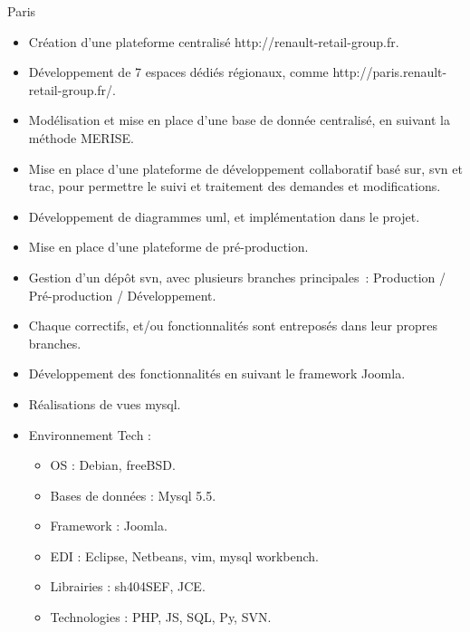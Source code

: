 \documentclass[10pt,a4paper,sans]{moderncv}
\begin{document}
{Paris}{
    \begin{itemize}%
        \item Création d'une plateforme centralisé http://renault-retail-group.fr.
        \item Développement de 7 espaces dédiés régionaux, comme http://paris.renault-retail-group.fr/.
        \item Modélisation et mise en place d'une base de donnée centralisé, en suivant la méthode MERISE.
        \item Mise en place d'une plateforme de développement collaboratif basé sur, svn et trac, pour permettre le suivi et traitement des demandes et modifications.
        \item Développement de diagrammes uml, et implémentation dans le projet.
        \item Mise en place d'une plateforme de pré-production.
        \item Gestion d'un dépôt svn, avec plusieurs branches principales : Production / Pré-production / Développement.
        \item Chaque correctifs, et/ou fonctionnalités sont entreposés dans leur propres branches.
        \item Développement des fonctionnalités en suivant le framework Joomla.
        \item Réalisations de vues mysql.
        \item Environnement Tech :
            \begin{itemize}%
                \item OS : Debian, freeBSD.
                \item Bases de données : Mysql 5.5.
                \item Framework : Joomla.
                \item EDI : Eclipse, Netbeans, vim, mysql workbench.
                \item Librairies : sh404SEF, JCE.
                \item Technologies : PHP, JS, SQL, Py, SVN.
            \end{itemize}
\end{itemize}}
\end{document}
